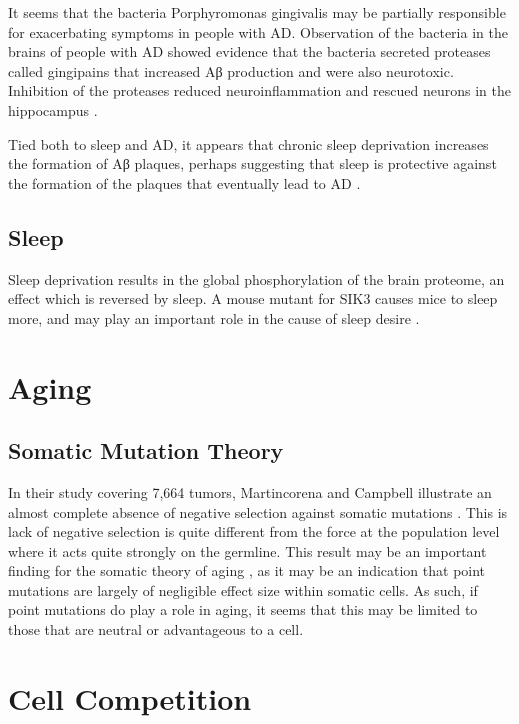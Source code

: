 \documentclass[]{book}
\begin{document}
It seems that the bacteria Porphyromonas gingivalis may be partially
responsible for exacerbating symptoms in people with AD. Observation of
the bacteria in the brains of people with AD showed evidence that the
bacteria secreted proteases called gingipains that increased Aβ
production and were also neurotoxic. Inhibition of the proteases reduced
neuroinflammation and rescued neurons in the hippocampus
\citep{dominy2019porphyromonas}.

Tied both to sleep and AD, it appears that chronic sleep deprivation
increases the formation of Aβ plaques, perhaps suggesting that sleep is
protective against the formation of the plaques that eventually lead to
AD \citep{Holth2019-cd}.

\section{Sleep}\label{sleep}

Sleep deprivation results in the global phosphorylation of the brain
proteome, an effect which is reversed by sleep. A mouse mutant for SIK3
causes mice to sleep more, and may play an important role in the cause
of sleep desire \citep{wang2018quantitative}.

\chapter{Aging}\label{aging}

\section{Somatic Mutation Theory}\label{somatic-mutation-theory}

In their study covering 7,664 tumors, Martincorena and Campbell
illustrate an almost complete absence of negative selection against
somatic mutations \citep{martincorena2017universal}. This is lack of
negative selection is quite different from the force at the population
level where it acts quite strongly on the germline. This result may be
an important finding for the somatic theory of aging
\citep{morley1995somatic}, as it may be an indication that point
mutations are largely of negligible effect size within somatic cells. As
such, if point mutations do play a role in aging, it seems that this may
be limited to those that are neutral or advantageous to a cell.

\chapter{Cell Competition}\label{competition}
\end{document}
